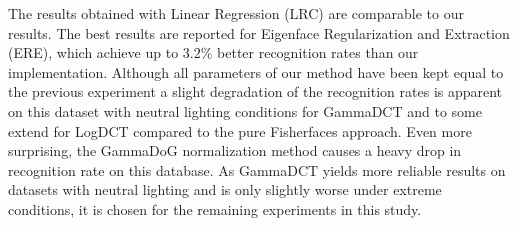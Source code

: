 The results obtained with Linear Regression (LRC) \cite{Naseem2010} are comparable to our results.
The best results are reported for Eigenface Regularization and Extraction (ERE), which achieve up to $3.2 \%$ better recognition rates than our implementation.
Although all parameters of our method have been kept equal to the previous experiment a slight degradation of the recognition rates is apparent on this dataset with neutral lighting conditions for GammaDCT and to some extend for LogDCT compared to the pure Fisherfaces approach. Even more surprising, the GammaDoG normalization method causes a heavy drop in recognition rate on this database.
As GammaDCT yields more reliable results on datasets with neutral lighting and is only slightly worse under extreme conditions, it is chosen for the remaining experiments in this study.

